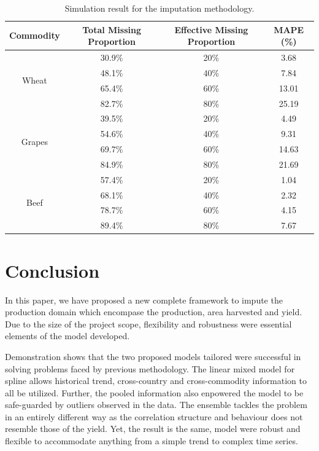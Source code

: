 \documentclass[nojss]{jss}\usepackage[]{graphicx}\usepackage[]{color}
\begin{document}
\begin{table}
  \centering
  \label{tab:simResult}
  \caption{Simulation result for the imputation methodology.}  
  \begin{tabular}{|c|c|c|c|}
    \hline
    Commodity & Total Missing Proportion & Effective Missing Proportion & MAPE (\%)\\
    \hline \hline
    \multirow{4}{*}{Wheat}
      & 30.9\%  & 20\% & 3.68\\
      & 48.1\%  & 40\% & 7.84\\
      & 65.4\%  & 60\% & 13.01\\
      & 82.7\%  & 80\% & 25.19\\
    \hline
    \multirow{4}{*}{Grapes}
      & 39.5\%  & 20\% & 4.49\\
      & 54.6\%  & 40\% & 9.31\\
      & 69.7\%  & 60\% & 14.63\\
      & 84.9\%  & 80\% & 21.69\\
    \hline
    \multirow{4}{*}{Beef}
      & 57.4\%  & 20\% & 1.04\\
      & 68.1\%  & 40\% & 2.32\\
      & 78.7\%  & 60\% & 4.15\\
      & 89.4\%  & 80\% & 7.67\\
    \hline 
  \end{tabular}
\end{table}


\FloatBarrier
\section{Conclusion}

In this paper, we have proposed a new complete framework to impute the
production domain which encompase the production, area harvested and
yield. Due to the size of the project scope, flexibility and
robustness were essential elements of the model developed.

Demonstration shows that the two proposed models tailored were
successful in solving problems faced by previous methodology. The
linear mixed model for spline allows historical trend, cross-country
and cross-commodity information to all be utilized. Further, the
pooled information also enpowered the model to be safe-guarded by
outliers observed in the data. The ensemble tackles the problem in an
entirely different way as the correlation structure and behaviour does
not resemble those of the yield. Yet, the result is the same, model
were robust and flexible to accommodate anything from a simple trend
to complex time series.
\end{document}
